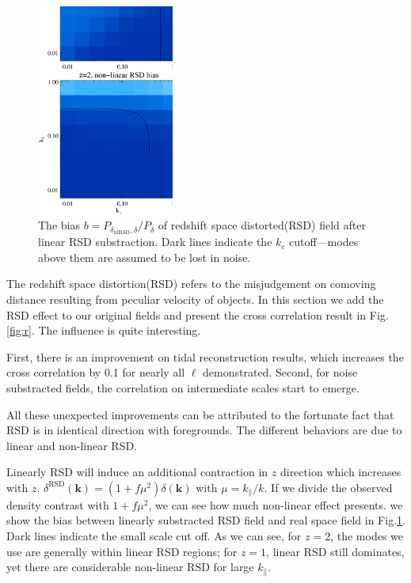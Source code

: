 \begin{figure}[tbp]
\begin{center}
\includegraphics[width=0.4\textwidth]{figure/compare_bias_rsdsub_z1z2.eps}
\end{center}
\vspace{-0.7cm}
\caption{The bias $b=P_{\delta_\mathrm{nlRSD},\delta}/P_{\delta}$ 
of redshift space distorted(RSD) field after linear RSD substraction.
Dark lines indicate the $k_c$ cutoff---modes above them are assumed to be lost in noise.}
\label{fig:bias}
\end{figure}
The redshift space distortion(RSD) refers to the misjudgement on comoving distance 
resulting from peculiar velocity of objects. 
In this section we add the RSD effect to our original fields and 
present the cross correlation result in Fig.\ref{fig:r}. 
The influence is quite interesting. 

First, there is an improvement on tidal reconstruction results, 
which increases the cross correlation by 0.1 for nearly all $\ell$ demonstrated. 
Second, for noise substracted fields, the correlation on intermediate scales start to emerge.  

All these unexpected improvements can be attributed to the fortunate fact 
that RSD is in identical direction with foregrounds. 
The different behaviors are due to linear and non-linear RSD. 

Linearly RSD will induce an additional contraction in $z$ direction 
which increases with $z$.  
$\delta^\mathrm{RSD}(\bm{k})=(1+f\mu^2)\delta(\bm{k})$ 
with $\mu=k_\parallel/k$. 
If we divide the observed density contrast with $1+f\mu^2$, 
we can see how much non-linear effect presents. 
we show the bias between linearly substracted RSD field 
and real space field  
in Fig.\ref{fig:bias}. 
Dark lines indicate the small scale cut off. 
As we can see, 
for $z=2$, the modes we use are generally 
within linear RSD regions; 
for $z=1$, linear RSD still dominates, yet there are considerable non-linear RSD for large $k_\parallel$.  

